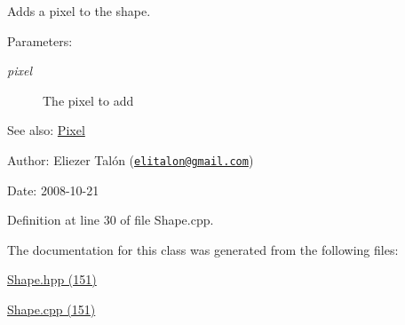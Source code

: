 Adds a pixel to the shape. 

\begin{Desc}
\item[Parameters:]
\begin{description}
\item[{\em pixel}]The pixel to add\end{description}
\end{Desc}
\begin{Desc}
\item[See also:]\hyperlink{_pixel_8hpp_535e59456e3e633842529cfa8ea103c4}{Pixel}\end{Desc}
\begin{Desc}
\item[Author:]Eliezer Talón (\href{mailto:elitalon@gmail.com}{\tt elitalon@gmail.com}) \end{Desc}
\begin{Desc}
\item[Date:]2008-10-21 \end{Desc}


Definition at line 30 of file Shape.cpp.

The documentation for this class was generated from the following files:\begin{CompactItemize}
\item 
\hyperlink{_shape_8hpp}{Shape.hpp (151)}\item 
\hyperlink{_shape_8cpp}{Shape.cpp (151)}\end{CompactItemize}
